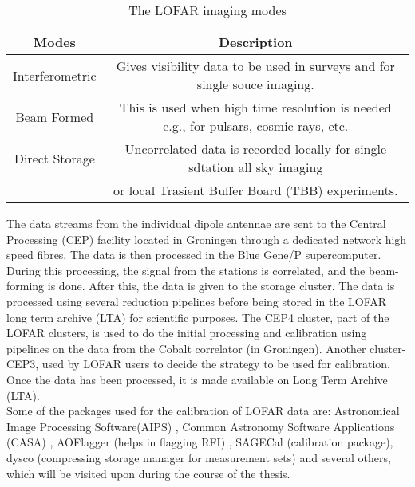 \documentclass[../main/thesis_msc.tex]{subfiles}
\begin{document}
\begin{table}[h]
\centering
\begin{tabular}{cc}
\toprule
\textbf{Modes} & \textbf{Description}\\ 
\midrule
Interferometric & Gives visibility data to be used in surveys and for single souce imaging. \\
Beam Formed & This is used when high time resolution is needed e.g., for pulsars, cosmic rays, etc. \\
Direct Storage & Uncorrelated data is recorded locally for single sdtation all sky imaging\\ & or local Trasient Buffer Board (TBB) experiments.\\
\bottomrule
\end{tabular}
\caption{The LOFAR imaging modes}
\label{moooo}
\end{table}

The data streams from the individual dipole antennae are sent to the Central Processing (CEP) facility located in Groningen through a dedicated network high speed fibres. The data is then processed in the Blue Gene/P supercomputer. During this processing, the signal from the stations is correlated, and the beam-forming is done. After this, the data is given to the storage cluster. The data is processed using several reduction pipelines before being stored in the LOFAR long term archive (LTA) for scientific purposes. 
The CEP4 cluster, part of the LOFAR clusters, is used to do the initial processing and calibration using pipelines on the data from the Cobalt correlator (in Groningen). Another cluster- CEP3, used by LOFAR users to decide the strategy to be used for calibration. Once the data has been processed, it is made available on Long Term Archive (LTA).\\

\noindent Some of the packages used for the calibration of LOFAR data are: Astronomical Image Processing Software(AIPS) \citep{aips}, Common Astronomy Software Applications (CASA) \citep{casa}, AOFlagger (helps in flagging RFI) \citep{aoflagger}, SAGECal (calibration package), dysco (compressing storage manager for measurement sets) and several others, which will be visited upon during the course of the thesis.
\end{document}
